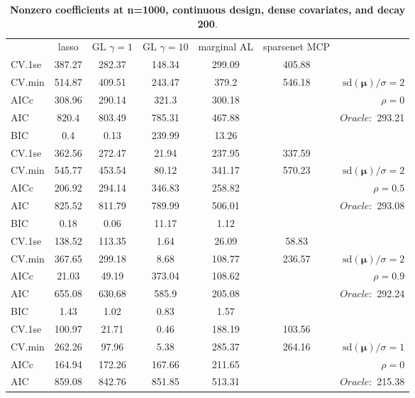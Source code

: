 \begin{table}\vspace{-.5cm}
\caption[l]{ { \bf Nonzero coefficients at n=1000, continuous design, 
dense covariates, and  decay  200}.}
\vspace{-.5cm}
\footnotesize{}
\begin{center}
\begin{tabular}{l*{5}{c}|r}
& lasso & GL $\gamma=1$ & GL $\gamma=10$ & marginal AL & sparsenet MCP  & \\
 \cline{1-7}
CV.1se & 387.27 & 282.37 & 148.34 & 299.09 & 405.88 & \\
CV.min & 514.87 & 409.51 & 243.47 & 379.2 & 546.18 &  $\mathrm{sd}(\mathbf{\mu})/\sigma=2$ \\
AICc & 308.96 & 290.14 & 321.3 & 300.18 & & $\rho=0$ \\
AIC & 820.4 & 803.49 & 785.31 & 467.88 & &  \multirow{2}{*}{$Oracle: $ 293.21} \\
BIC & 0.4 & 0.13 & 239.99 & 13.26 & &  \\
 \hline 
CV.1se & 362.56 & 272.47 & 21.94 & 237.95 & 337.59 & \\
CV.min & 545.77 & 453.54 & 80.12 & 341.17 & 570.23 &  $\mathrm{sd}(\mathbf{\mu})/\sigma=2$ \\
AICc & 206.92 & 294.14 & 346.83 & 258.82 & & $\rho=0.5$ \\
AIC & 825.52 & 811.79 & 789.99 & 506.01 & &  \multirow{2}{*}{$Oracle: $ 293.08} \\
BIC & 0.18 & 0.06 & 11.17 & 1.12 & &  \\
 \hline 
CV.1se & 138.52 & 113.35 & 1.64 & 26.09 & 58.83 & \\
CV.min & 367.65 & 299.18 & 8.68 & 108.77 & 236.57 &  $\mathrm{sd}(\mathbf{\mu})/\sigma=2$ \\
AICc & 21.03 & 49.19 & 373.04 & 108.62 & & $\rho=0.9$ \\
AIC & 655.08 & 630.68 & 585.9 & 205.08 & &  \multirow{2}{*}{$Oracle: $ 292.24} \\
BIC & 1.43 & 1.02 & 0.83 & 1.57 & &  \\
 \hline 
CV.1se & 100.97 & 21.71 & 0.46 & 188.19 & 103.56 & \\
CV.min & 262.26 & 97.96 & 5.38 & 285.37 & 264.16 &  $\mathrm{sd}(\mathbf{\mu})/\sigma=1$ \\
AICc & 164.94 & 172.26 & 167.66 & 211.65 & & $\rho=0$ \\
AIC & 859.08 & 842.76 & 851.85 & 513.31 & &  \multirow{2}{*}{$Oracle: $ 215.38} \\

\end{tabular}
\end{center}
\end{table}
